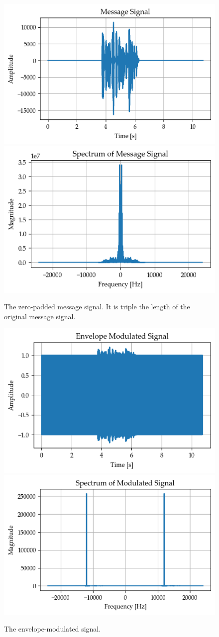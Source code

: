 \documentclass[../ECE459FinalProjectReport.tex]{subfiles}
\begin{document}
\begin{figure}[tb]
    \centering
    \includegraphics[width=0.49\linewidth]{plots/am/message_time.png}
    \includegraphics[width=0.49\linewidth]{plots/am/message_spectrum.png}
    \caption{The zero-padded message signal. It is triple the length of the original message signal.}
    \label{fig:am-long-message}
\end{figure}
\begin{figure}[tb]
    \centering
    \includegraphics[width=0.49\linewidth]{plots/am/modulated_time.png}
    \includegraphics[width=0.49\linewidth]{plots/am/modulated_spectrum.png}
    \caption{The envelope-modulated signal.}
    \label{fig:am-modulated}
\end{figure}
\end{document}
